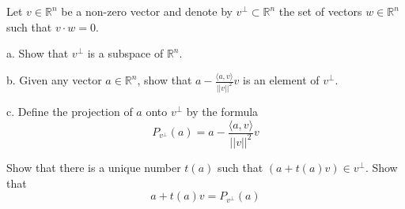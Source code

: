 \newpage

\begin{exercise}{24}
    Let $v \in \mathbb{R}^n$ be a non-zero vector and denote by $v^\bot \subset \mathbb{R}^n$ the set of vectors $w \in \mathbb{R}^n$ such that $v \cdot w = 0$.

    a. Show that $v^\bot$ is a subspace of $\mathbb{R}^n$.

    b. Given any vector $a \in \mathbb{R}^n$, show that $a - \frac{\langle a, v \rangle}{\lvert \lvert v \rvert \rvert^2}v$ is an element of $v^\bot$.

    c. Define the projection of $a$ onto $v^\bot$ by the formula
    $$P_{v^\bot}(a) = a - \frac{\langle a, v \rangle}{\lvert \lvert v \rvert \rvert^2}v$$

    Show that there is a unique number $t(a)$ such that $(a+t(a)v) \in v^\bot$. Show that
    $$a+t(a)v = P_{v^\bot}(a)$$
\end{exercise}

